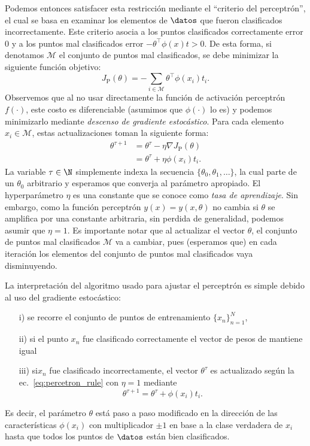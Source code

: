 Podemos entonces satisfacer esta restricción mediante el ``criterio del perceptrón'', el cual se basa en examinar  los elementos de $\datos$ que fueron clasificados incorrectamente. Este criterio asocia a los puntos clasificados correctamente error 0 y a los puntos mal clasificados error $-\theta^\top\phi(x)t>0$. De esta forma, si denotamos $\mathcal{M}$ el conjunto de puntos mal clasificados, se debe minimizar la siguiente función objetivo:
\begin{equation}
	J_\text{P}(\theta) = -\sum_{i\in\mathcal{M}}\theta^\top\phi(x_i)t_i. 
\end{equation}
Observemos que al no usar directamente la función de activación perceptrón $f(\cdot)$, este costo es diferenciable (asumimos que $\phi(\cdot)$ lo es) y podemos  minimizarlo mediante \emph{descenso de gradiente estocástico}. Para cada elemento $x_i\in\mathcal{M}$, estas actualizaciones toman la siguiente forma:
\begin{align}
	\theta^{\tau+1} &= \theta^\tau - \eta \nabla J_\text{P}(\theta)\nonumber\\
	&= \theta^\tau + \eta \phi(x_i)t_i.\label{eq:percetron_rule}
\end{align}
La variable $\tau\in\N$ simplemente indexa la secuencia $\{\theta_0,\theta_1,\ldots\}$, la cual  parte de un $\theta_0$ arbitrario y esperamos que converja al parámetro apropiado. El hyperparámetro $\eta$ es una constante que se conoce como \emph{tasa de aprendizaje}. Sin embargo, como la función perceptrón $y(x)=y(x,\theta)$ no cambia si $\theta$ se amplifica por una constante arbitraria, sin perdida de generalidad, podemos asumir que $\eta=1$. Es importante notar que al actualizar el vector $\theta$, el conjunto de puntos mal clasificados $\mathcal{M}$ va a cambiar, pues (esperamos que) en cada iteración los elementos del conjunto de puntos mal clasificados vaya disminuyendo.

La interpretación del algoritmo usado para ajustar el perceptrón es simple debido al uso del gradiente estocástico: 
\begin{itemize}
	\item[i)] se recorre el conjunto de puntos de entrenamiento $\{x_n\}_{n=1}^N$,
	\item[ii)] si el punto $x_n$ fue clasificado correctamente el vector de pesos de mantiene igual
	\item[iii)] si$x_n$ fue clasificado incorrectamente, el vector $\theta^\tau$ es actualizado según la ec.~\eqref{eq:percetron_rule} con $\eta=1$ mediante
	\begin{equation}
	 \theta^{\tau+1} = \theta^\tau + \phi(x_i)t_i.
\end{equation}
\end{itemize}
Es decir, el parámetro $\theta$ está paso a paso modificado en la dirección de las características $\phi(x_i)$ con multiplicador $\pm1$ en base a la clase verdadera de $x_i$ hasta  que todos los puntos de $\datos$ están bien clasificados. 

